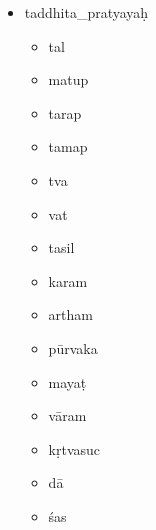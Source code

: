 \documentclass{article}
\begin{document}
\begin{itemize}
\item taddhita\_pratyaya\d{h}
\begin{itemize}
\item tal
\item matup
\item tarap
\item tamap
\item tva
\item vat
\item tasil
\item karam
\item artham
\item p{\=u}rvaka
\item maya\d{t}
\item v{\=a}ram
\item k\d{r}tvasuc
\item d{\=a}
\item \'{s}as
\end{itemize}
\end{itemize}
\end{document}
